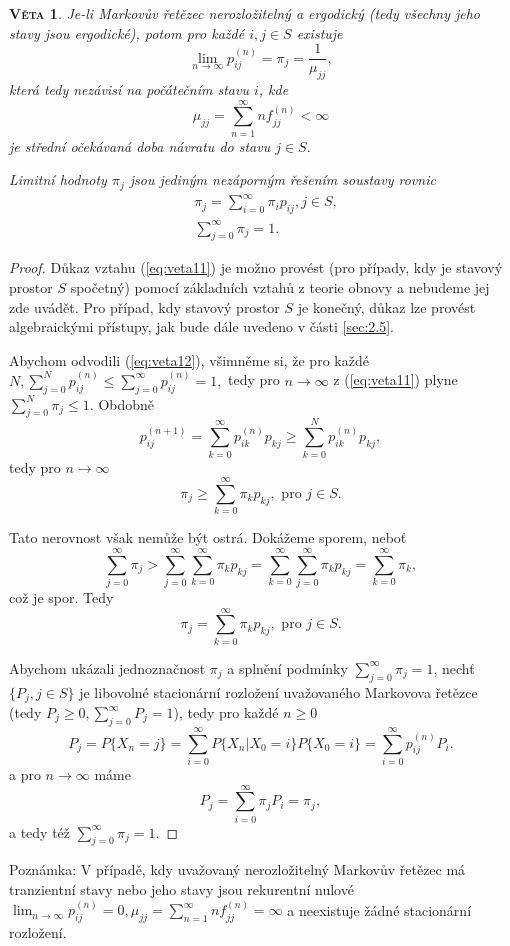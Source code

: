 \documentclass[10pt]{article}
\newtheorem{proposition}{\textsc{Věta}}
\begin{document}
\begin{proposition}
Je-li Markovův řetězec nerozložitelný a ergodický (tedy všechny jeho stavy jsou ergodické), potom pro každé $i,j \in S$ existuje \begin{equation}\label{eq:veta11}\lim_{n \to \infty} p_{ij}^{(n)} = \pi_j= \frac{1}{\mu_{jj}},\end{equation} která tedy nezávisí na počátečním stavu $i$, kde $$\mu_{jj}= \sum_{n=1}^\infty n f_{jj}^{(n)}< \infty$$ je střední očekávaná doba návratu do stavu $j \in S.$

Limitní hodnoty $\pi_j$ jsou jediným nezáporným řešením soustavy rovnic
\begin{equation}
\label{eq:veta12}
\begin{split}
&\pi_j = \sum_{i=0}^\infty \pi_i p_{ij}, j \in S,\\
&\sum_{j=0}^\infty \pi_j = 1.
\end{split}
\end{equation}
\end{proposition}
\begin{proof}
Důkaz vztahu (\ref{eq:veta11}) je možno provést (pro případy, kdy je stavový prostor $S$ spočetný) pomocí základních vztahů z teorie obnovy a nebudeme jej zde uvádět. Pro případ, kdy stavový prostor $S$ je konečný, důkaz lze provést algebraickými přístupy, jak bude dále uvedeno v části \ref{sec:2.5}.

Abychom odvodili (\ref{eq:veta12}), všimněme si, že pro každé $N, \sum_{j=0}^{N}p_{ij}^{(n)} \leq \sum_{j=0}^{\infty}p_{ij}^{(n)} = 1,$ tedy pro $n \to \infty$ z (\ref{eq:veta11}) plyne $\sum_{j=0}^N \pi_j \leq 1.$ Obdobně $$p_{ij}^{(n+1)} = \sum_{k=0}^{\infty} p_{ik}^{(n)} p_{kj} \geq \sum_{k=0}^{N} p_{ik}^{(n)} p_{kj},$$ tedy pro $n \to \infty$ $$\pi_j  \geq \sum_{k=0}^\infty \pi_k p_{kj}, \text{ pro }j \in S.$$

Tato nerovnost však nemůže být ostrá. Dokážeme sporem, neboť $$\sum_{j=0}^{\infty} \pi_j > \sum_{j=0}^{\infty} \sum_{k=0}^\infty \pi_k p_{kj} = \sum_{k=0}^\infty \sum_{j=0}^{\infty} \pi_k p_{kj} = \sum_{k=0}^{\infty} \pi_k,$$ což je spor. Tedy $$\pi_j  = \sum_{k=0}^\infty \pi_k p_{kj}, \text{ pro }j \in S.$$

Abychom ukázali jednoznačnost $\pi_j$ a splnění podmínky $\sum_{j=0}^{\infty} \pi_j = 1$, nechť $\{P_j, j \in S\}$ je libovolné stacionární rozložení uvažovaného Markovova řetězce (tedy $P_j \geq0, \sum_{j=0}^{\infty} P_j = 1$), tedy pro každé $n \geq 0$ $$P_j = P\{X_n = j\} = \sum_{i=0}^{\infty} P\{X_n|X_0=i\}P\{X_0=i\} = \sum_{i=0}^{\infty} p_{ij}^{(n)}P_i.$$ a pro $n \to \infty$ máme $$P_j = \sum_{i=0}^{\infty} \pi_j P_i = \pi_j,$$ a tedy též $\sum_{j=0}^\infty \pi_j = 1$.
\end{proof}
Poznámka: V případě, kdy uvažovaný nerozložitelný Markovův řetězec má tranzientní stavy nebo jeho stavy jsou rekurentní nulové $\lim_{n \to \infty} p_{ij}^{(n)} = 0, \mu_{jj} = \sum_{n=1}^{\infty} n f_{jj}^{(n)} = \infty$ a neexistuje žádné stacionární rozložení.
\end{document}
